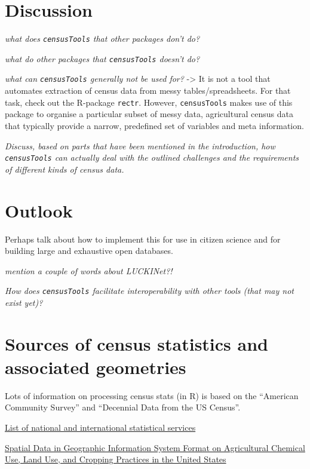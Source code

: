 \documentclass[12pt,]{article}
\begin{document}
\hypertarget{discussion}{%
\section{Discussion}\label{discussion}}

\emph{what does \texttt{censusTools} that other packages don't do?}

\emph{what do other packages that \texttt{censusTools} doesn't do?}

\emph{what can \texttt{censusTools} generally not be used for?} -\textgreater{} It is not a tool that automates extraction of census data from messy tables/spreadsheets. For that task, check out the R-package \texttt{rectr}. However, \texttt{censusTools} makes use of this package to organise a particular subset of messy data, agricultural census data that typically provide a narrow, predefined set of variables and meta information.

\emph{Discuss, based on parts that have been mentioned in the introduction, how \texttt{censusTools} can actually deal with the outlined challenges and the requirements of different kinds of census data.}

\hypertarget{outlook}{%
\section{Outlook}\label{outlook}}

Perhaps talk about how to implement this for use in citizen science and for building large and exhaustive open databases.

\emph{mention a couple of words about LUCKINet?!}

\emph{How does \texttt{censusTools} facilitate interoperability with other tools (that may not exist yet)?}

\hypertarget{sources-of-census-statistics-and-associated-geometries}{%
\section{Sources of census statistics and associated geometries}\label{sources-of-census-statistics-and-associated-geometries}}

Lots of information on processing census stats (in R) is based on the ``American Community Survey'' and ``Decennial Data from the US Census''.

\href{https://en.wikipedia.org/wiki/List_of_national_and_international_statistical_services}{List of national and international statistical services}

\href{https://pubs.usgs.gov/wri/wri944176/}{Spatial Data in Geographic Information System Format on Agricultural Chemical Use, Land Use, and Cropping Practices in the United States}
\end{document}

